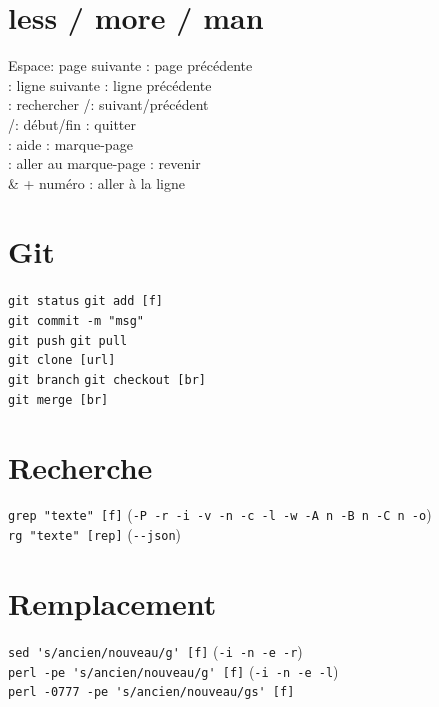\documentclass[10pt]{article}
\begin{document}
\begin{multicols}{4}
\section*{less / more / man}
Espace: page suivante \quad {}: page précédente \\
\keys{\return}{}: ligne suivante \quad {}: ligne précédente \\
\keys{/}: rechercher \quad {}/: suivant/précédent \\
/: début/fin \quad {}: quitter \\
: aide \quad {}: marque-page \\
: aller au marque-page \quad {}: revenir \\
\keys{+} \& \keys{-} + numéro : aller à la ligne \\

\section*{Git}
\lstinline|git status| \quad \lstinline|git add [f]| \\
\lstinline|git commit -m "msg"| \\
\lstinline|git push| \quad \lstinline|git pull| \\
\lstinline|git clone [url]| \\
\lstinline|git branch| \quad \lstinline|git checkout [br]| \\
\lstinline|git merge [br]| \\

\section*{Recherche}
\lstinline|grep "texte" [f]| (\lstinline|-P -r -i -v -n -c -l -w -A n -B n -C n -o|) \\
\lstinline|rg "texte" [rep]| (\lstinline|--json|) \\

\section*{Remplacement}
\lstinline|sed 's/ancien/nouveau/g' [f]| (\lstinline|-i -n -e -r|) \\
\lstinline|perl -pe 's/ancien/nouveau/g' [f]| (\lstinline|-i -n -e -l|) \\
\lstinline|perl -0777 -pe 's/ancien/nouveau/gs' [f]| \\


\end{multicols}
\end{document}

